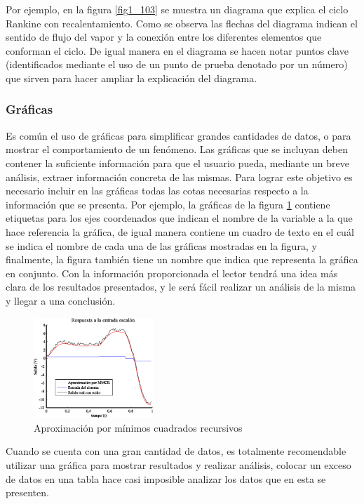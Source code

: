 Por ejemplo, en la figura \ref{fig1_103} se muestra un diagrama que explica el ciclo Rankine con recalentamiento. Como se observa las flechas del diagrama indican el sentido de flujo del vapor y la conexión entre los diferentes elementos que conforman el ciclo. De igual manera en el diagrama se hacen notar puntos clave (identificados mediante el uso de un punto de prueba denotado por un número) que sirven para hacer ampliar la explicación del diagrama.

\subsubsection{Gráficas}

Es común el uso de gráficas para simplificar grandes cantidades de datos, o para mostrar el comportamiento de un fenómeno. Las gráficas que se incluyan deben contener la suficiente información para que el usuario pueda, mediante un breve análisis, extraer información concreta de las mismas. Para lograr este objetivo es necesario incluir en las gráficas todas las cotas necesarias respecto a la información que se presenta. Por ejemplo, la gráficas de la figura  \ref{fig1_107} contiene etiquetas para los ejes coordenados que indican el nombre de la variable a la que hace referencia la gráfica, de igual manera contiene un cuadro de texto en el cuál se indica el nombre de cada una de las gráficas mostradas en la figura, y finalmente, la figura también tiene un nombre que indica que representa la gráfica en conjunto. Con la información proporcionada el lector tendrá una idea más clara de los resultados presentados, y le será fácil realizar un análisis de la misma y llegar a una conclusión.

\begin{figure}[!htbp]
        \centering
        \includegraphics[width=0.4\textwidth]{images/grafica.eps}
        \caption{\footnotesize{Aproximación por mínimos cuadrados recursivos}}
        \label{fig1_107}
\end{figure}

Cuando se cuenta con una gran cantidad de datos, es totalmente recomendable utilizar una gráfica para mostrar resultados y realizar análisis, colocar un exceso de datos en una tabla hace casi imposible analizar los datos que en esta se presenten.


